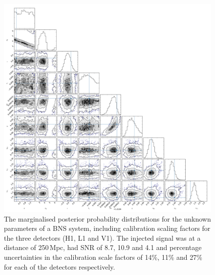 \documentclass[10pt]{iopart}
\begin{document}
\begin{figure}
 \begin{center}
  \includegraphics[width=1.0\textwidth]{bns_post_fig.pdf}
 \end{center}
 \caption{\label{fig:bnspost} The marginalised posterior probability distributions for the unknown
 parameters of a \ac{BNS} system, including calibration scaling factors for the three detectors 
(H1, L1 and V1). The injected signal was at a distance of 250\,Mpc, had \ac{SNR} of 8.7, 10.9 and 
4.1 and percentage uncertainties in the calibration scale factors of 14\%, 11\% and 27\% for each 
of the detectors respectively.}
\end{figure}
\end{document}
